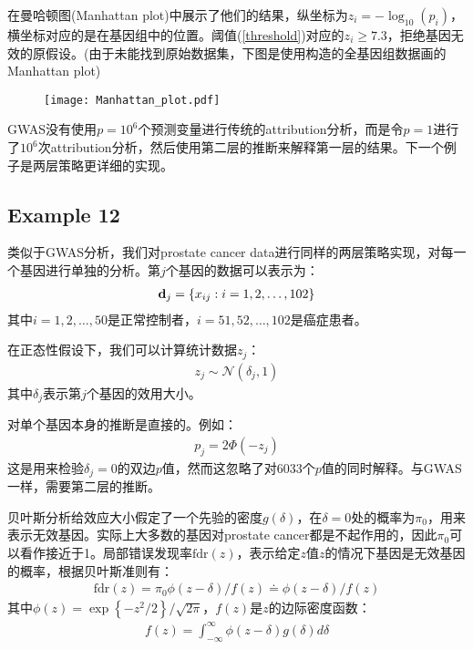 \documentclass[lang=cn,11pt,a4paper,cite=authoryear]{elegantpaper}
\begin{document}
\cite{ikram2010four}在曼哈顿图(Manhattan plot)中展示了他们的结果，纵坐标为$z_i = -\log_{10}(p_i)$，横坐标对应的是在基因组中的位置。阈值(\ref{threshold})对应的$z_i \geq 7.3$，拒绝基因无效的原假设。(由于未能找到原始数据集，下图是使用构造的全基因组数据画的Manhattan plot)
\begin{figure}[H]
		\centering
		\texttt{[image: Manhattan\_plot.pdf]}
\end{figure}

GWAS没有使用$p = 10^6$个预测变量进行传统的attribution分析，而是令$p=1$进行了$10^6$次attribution分析，然后使用第二层的推断来解释第一层的结果。下一个例子是两层策略更详细的实现。

\subsection{Example 12}

类似于GWAS分析，我们对prostate cancer data进行同样的两层策略实现，对每一个基因进行单独的分析。第$j$个基因的数据可以表示为：
\begin{align}
\bold{d}_{j}=\left\{x_{i j}: i=1,2, \ldots, 102\right\}
\end{align}
其中$i = 1,2, \ldots, 50$是正常控制者，$i = 51,52, \ldots, 102$是癌症患者。

在正态性假设下，我们可以计算统计数据$z_j$：
\begin{align}
z_{j} \sim \mathcal{N}\left(\delta_{j}, 1\right)
\end{align}
其中$\delta_j$表示第$j$个基因的效用大小。

对单个基因本身的推断是直接的。例如：
\begin{align}
p_{j}=2 \Phi\left(-z_{j}\right)
\end{align}
这是用来检验$\delta_j=0$的双边$p$值，然而这忽略了对6033个$p$值的同时解释。与GWAS一样，需要第二层的推断。

贝叶斯分析给效应大小假定了一个先验的密度$g(\delta)$，在$\delta=0$处的概率为$\pi_0$，用来表示无效基因。实际上大多数的基因对prostate cancer都是不起作用的，因此$\pi_0$可以看作接近于1。局部错误发现率$\text{fdr}(z)$，表示给定$z$值$z$的情况下基因是无效基因的概率，根据贝叶斯准则有：
\begin{align}
\text{fdr}(z)=\pi_{0} \phi(z-\delta) / f(z) \doteq \phi(z-\delta) / f(z)
\end{align}
其中$\phi(z)=\exp \left\{-z^{2} / 2\right\} / \sqrt{2 \pi}$，$f(z)$是$z$的边际密度函数：
\begin{align}
f(z)=\int_{-\infty}^{\infty} \phi(z-\delta) g(\delta) d \delta
\end{align}
\end{document}
